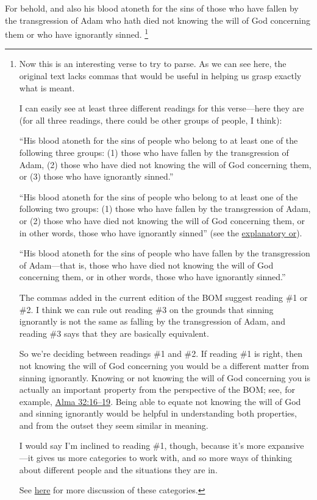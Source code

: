 			For behold, and also his blood atoneth for the sins of those
			who have fallen by the transgression of Adam
			who hath died not knowing the will of God concerning them
			or who have ignorantly sinned.%
				\footnote{%
					\label{MOSIAH-3-11-NOTE-categories}%
					Now this is an interesting verse to try to parse. As we can see here, the original text lacks commas that would be useful in helping us grasp exactly what is meant.
					
					I can easily see at least three different readings for this verse---here they are (for all three readings, there could be other groups of people, I think):
					
						\begin{compactdesc}
							\item[Reading \#1] ``His blood atoneth for the sins of people who belong to at least one of the following three groups: (1) those who have fallen by the transgression of Adam, (2) those who have died not knowing the will of God concerning them, or (3) those who have ignorantly sinned.''
							\item[Reading \#2] ``His blood atoneth for the sins of people who belong to at least one of the following two groups: (1) those who have fallen by the transgression of Adam, or (2) those who have died not knowing the will of God concerning them, or in other words, those who have ignorantly sinned'' (see the \hyperref[OR-COMMENTARY-explanatory]{explanatory or}).
							\item[Reading \#3] ``His blood atoneth for the sins of people who have fallen by the transgression of Adam---that is, those who have died not knowing the will of God concerning them, or in other words, those who have ignorantly sinned.''
						\end{compactdesc}
						
					The commas added in the current edition of the BOM suggest reading \#1 or \#2. I think we can rule out reading \#3 on the grounds that sinning ignorantly is not the same as falling by the transgression of Adam, and reading \#3 says that they are basically equivalent.
					
					So we're deciding between readings \#1 and \#2. If reading \#1 is right, then not knowing the will of God concerning you would be a different matter from sinning ignorantly. Knowing or not knowing the will of God concerning you is actually an important property from the perspective of the BOM; see, for example, \hyperref[ALMA-32-16]{Alma 32:16--19}. Being able to equate not knowing the will of God and sinning ignorantly would be helpful in understanding both properties, and from the outset they seem similar in meaning.
					
					I would say I'm inclined to reading \#1, though, because it's more expansive---it gives us more categories to work with, and so more ways of thinking about different people and the situations they are in.
					
					See \hyperref[ATONEMENT-categories]{here} for more discussion of these categories.
					}

